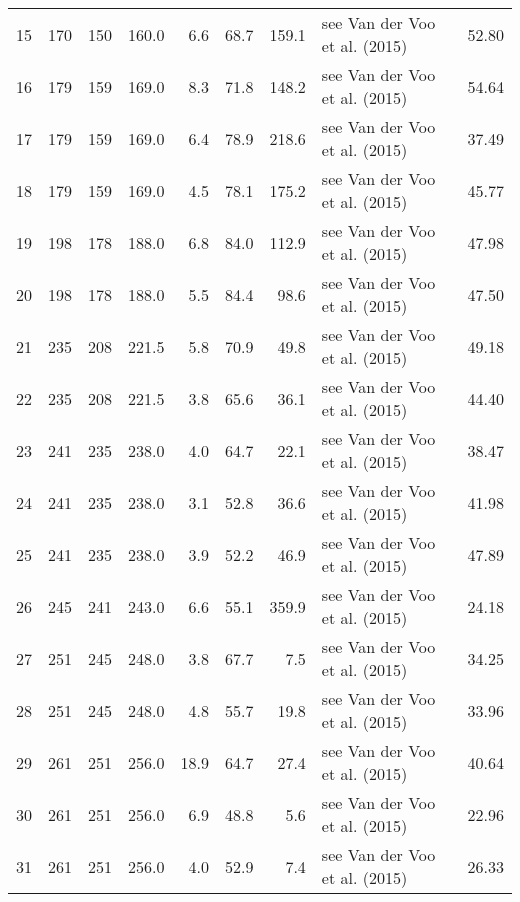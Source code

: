 \documentclass[11pt]{article}
\begin{document}
\begin{sidewaystable}
{\begin{tabular}{lrrrrrrlr}
15 &       170 &      150 &       160.0 &   6.6 &  68.7 &  159.1 &     see Van der Voo et al. (2015) &     52.80 \\
16 &       179 &      159 &       169.0 &   8.3 &  71.8 &  148.2 &     see Van der Voo et al. (2015) &     54.64 \\
17 &       179 &      159 &       169.0 &   6.4 &  78.9 &  218.6 &     see Van der Voo et al. (2015) &     37.49 \\
18 &       179 &      159 &       169.0 &   4.5 &  78.1 &  175.2 &     see Van der Voo et al. (2015) &     45.77 \\
19 &       198 &      178 &       188.0 &   6.8 &  84.0 &  112.9 &     see Van der Voo et al. (2015) &     47.98 \\
20 &       198 &      178 &       188.0 &   5.5 &  84.4 &   98.6 &     see Van der Voo et al. (2015) &     47.50 \\
21 &       235 &      208 &       221.5 &   5.8 &  70.9 &   49.8 &     see Van der Voo et al. (2015) &     49.18 \\
22 &       235 &      208 &       221.5 &   3.8 &  65.6 &   36.1 &     see Van der Voo et al. (2015) &     44.40 \\
23 &       241 &      235 &       238.0 &   4.0 &  64.7 &   22.1 &     see Van der Voo et al. (2015) &     38.47 \\
24 &       241 &      235 &       238.0 &   3.1 &  52.8 &   36.6 &     see Van der Voo et al. (2015) &     41.98 \\
25 &       241 &      235 &       238.0 &   3.9 &  52.2 &   46.9 &     see Van der Voo et al. (2015) &     47.89 \\
26 &       245 &      241 &       243.0 &   6.6 &  55.1 &  359.9 &     see Van der Voo et al. (2015) &     24.18 \\
27 &       251 &      245 &       248.0 &   3.8 &  67.7 &    7.5 &     see Van der Voo et al. (2015) &     34.25 \\
28 &       251 &      245 &       248.0 &   4.8 &  55.7 &   19.8 &     see Van der Voo et al. (2015) &     33.96 \\
29 &       261 &      251 &       256.0 &  18.9 &  64.7 &   27.4 &     see Van der Voo et al. (2015) &     40.64 \\
30 &       261 &      251 &       256.0 &   6.9 &  48.8 &    5.6 &     see Van der Voo et al. (2015) &     22.96 \\
31 &       261 &      251 &       256.0 &   4.0 &  52.9 &    7.4 &     see Van der Voo et al. (2015) &     26.33 \\

\end{tabular}}
\end{sidewaystable}
\end{document}
